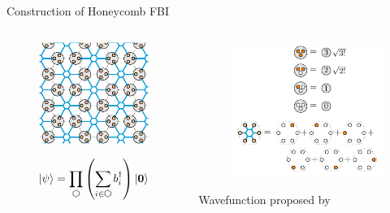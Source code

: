 \begin{frame}{Construction of Honeycomb FBI}
\vskip-1.5cm
\begin{columns}[T]
    \begin{column}[T]{.5\textwidth}
 	    \begin{figure}
			\includegraphics[width=\textwidth]{diagrams/FI_PEPS.pdf}
			\end{figure}
			$$
\ket{\psi} = \prod\limits_{\varhexagon} \left(\sum\limits_{i \in \varhexagon} b^{\dagger}_i \right) \ket{\mathbf{0}}
			$$ 
    \end{column}
    \begin{column}[T]{.5\textwidth}
     	\begin{figure}
				\includegraphics[width=\textwidth]{diagrams/SC_HFBI_rules.pdf}
			\end{figure}
			\bi
			\item[] Wavefunction proposed by \cite{kimchi2013}
			\ei
    \end{column}
\end{columns}
\end{frame}